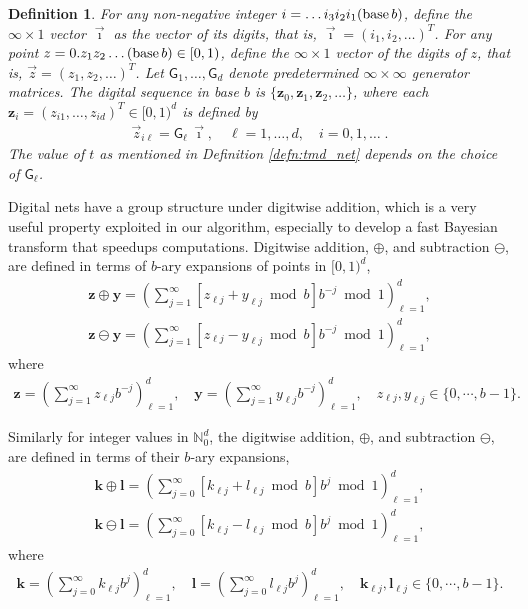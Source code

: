 \documentclass{svjour3}                     %
\newtheorem{defn}{Definition}
\newcommand{\bm}[1]{\boldsymbol{#1}}
\newcommand{\naturals}{\mathbb{N}}
\newcommand{\vk}{\bm{k}}
\newcommand{\vl}{\bm{l}}
\newcommand{\vy}{\bm{y}}
\newcommand{\vz}{\bm{z}}
\begin{document}
\begin{defn}
	For any non-negative integer $i = \dots i_3 i_2 i_1(\textup{base} \, b)$, define the $\infty \times 1$ vector $\vec{\imath}$ as the vector of its digits, that is, $\vec{\imath} = (i_1, i_2, \dots)^T$. 
	For any point $z = 0.z_1 z_2 \dots (\textup{base}\, b) \in [0, 1)$, define the $\infty \times 1$ vector of the digits of $z$, that is, $\vec{z} = (z_1, z_2, \dots)^T$. 
	Let $ \mathsf{G}_1, \dots , \mathsf{G}_d$ denote predetermined $\infty \times \infty$ generator matrices. 
	The digital sequence in \textup{base} $b$ is $\{\vz_0, \vz_1, \vz_2, \dots\}$, where each $\vz_i = ( z_{i1}, \dots , z_{id})^T \in [0, 1)^d$ is defined by
	\begin{align*}
	\vec{z}_{i\ell} = \mathsf{G}_{\ell} \, \vec{\imath}, \quad \ell = 1, \dots, d, \quad i = 0, 1, \dots \;.
	\end{align*}
	The value of $t$ as mentioned in Definition \ref{defn:tmd_net} depends on the choice of $\mathsf{G}_{\ell}$.
\end{defn}



Digital nets have a group structure under digitwise addition, which is a very useful property exploited in our algorithm, especially to develop a fast Bayesian transform that speedups computations.
Digitwise addition, $\oplus$, and subtraction $\ominus$, are defined in terms of $b$-ary expansions of points in $[0, 1)^d$,
\begin{align*}
\vz \oplus \vy = \left( \sum_{j=1}^\infty [z_{\ell j} + y_{\ell j} \bmod b] b^{-j} \bmod 1 \right)_{\ell=1}^d,
\\
\vz \ominus \vy = \left( \sum_{j=1}^\infty [z_{\ell j} - y_{\ell j} \bmod b] b^{-j} \bmod 1 \right)_{\ell=1}^d,
\end{align*}
where
\begin{align*}
\vz = \left( \sum_{j=1}^{\infty} z_{\ell j}b^{-j}\right)_{\ell=1}^d, \quad
\vy = \left( \sum_{j=1}^{\infty} y_{\ell j}b^{-j}\right)_{\ell=1}^d, \quad
z_{\ell j}, y_{\ell j} \in \{0,\cdots,b-1\}.
\end{align*}



Similarly for integer values in $\naturals_0^d$, the digitwise addition, $\oplus$, and subtraction $\ominus$, are defined in terms of their $b$-ary expansions,
\begin{align*}
\vk \oplus \vl = \left( \sum_{j=0}^\infty [k_{\ell j} + l_{\ell j} \bmod b] b^{j} \bmod 1 \right)_{\ell=1}^d,
\\
\vk \ominus \vl = \left( \sum_{j=0}^\infty [k_{\ell j} - l_{\ell j} \bmod b] b^{j} \bmod 1 \right)_{\ell=1}^d,
\end{align*}
where
\begin{align*}
\vk = \left( \sum_{j=0}^{\infty} k_{\ell j}b^{j}\right)_{\ell=1}^d, \quad
\vl = \left( \sum_{j=0}^{\infty} l_{\ell j}b^{j}\right)_{\ell=1}^d, \quad
\vk_{\ell j}, \vl_{\ell j} \in \{0,\cdots,b-1\}.
\end{align*}
\end{document}
